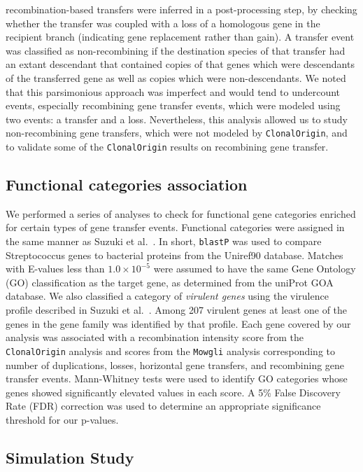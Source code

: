 \documentclass[10pt]{article}
\let\citep\cite
\let\citet\cite
\begin{document}
recombination-based transfers were inferred in a post-processing step, by
checking whether the transfer was coupled with a loss of a homologous gene in
the recipient branch (indicating gene replacement rather than gain).  A transfer
event was classified as non-recombining if the destination species of that
transfer had an extant descendant that contained copies of that genes which were
descendants of the transferred gene as well as copies which were
non-descendants.  We noted that this parsimonious approach was imperfect and
would tend to undercount events, especially recombining gene transfer events,
which were modeled using two events: a transfer and a loss.  Nevertheless, this
analysis allowed us to study non-recombining gene transfers, which were not
modeled by \texttt{ClonalOrigin}, and to validate some of the
\texttt{ClonalOrigin} results on recombining gene transfer.  

\subsection*{Functional categories association}

We performed a series of analyses to check for functional gene categories
enriched for certain types of gene transfer events. Functional categories were
assigned in the same manner as Suzuki et al.\ \citet{Suzuki2011}. In short, \texttt{blastP} was
used to compare Streptococcus genes to bacterial proteins from the Uniref90
database.  Matches with E-values less than $1.0\times10^{-5}$ were assumed to
have the same Gene Ontology (GO) classification as the target gene, as
determined from the uniProt GOA database.  We also classified a category of
\textit{virulent genes} using the virulence profile described in
Suzuki et al.\ \citet{Suzuki2011}. Among 207 virulent genes at least one of the genes in the
gene family was identified by that profile.  Each gene covered by our analysis
was associated with a recombination intensity score from the
\texttt{ClonalOrigin} analysis and scores from the \texttt{Mowgli} analysis
corresponding to number of duplications, losses, horizontal gene transfers, and
recombining gene transfer events.  Mann-Whitney tests were used to identify GO
categories whose genes showed significantly elevated values in each score.  A
5\% False Discovery Rate (FDR) correction \citep{Benjamini1995} was used to
determine an appropriate significance threshold for our p-values.

\subsection*{Simulation Study}
\end{document}
